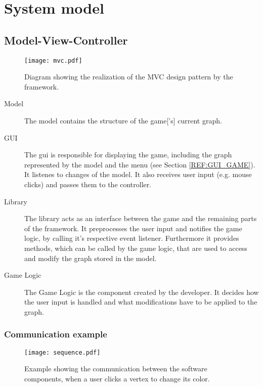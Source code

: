 \section{System model}

\subsection{Model-View-Controller}


\begin{figure}[h]
	\centering
	\texttt{[image: mvc.pdf]}
	\caption{Diagram showing the realization of the \gls{MVC} design pattern by the framework.}
	\label{img:MVC}
\end{figure}

\begin{description}
\item[Model] The model contains the structure of the \gls{game}['s] current \gls{graph}.
\item[GUI] The \gls{gui} is responsible for displaying the game, including the \gls{graph} represented by the model and the menu (see Section \ref{REF:GUI_GAME}). It listenes to changes of the model. It also receives user input (e.g. mouse clicks) and passes them to the controller.
\item[Library] The library acts as an interface between the game and the remaining parts of the framework. It preprocesses the user input and notifies the game logic, by calling it's respective event listener. Furthermore it provides methods, which can be called by the game logic, that are used to access and modify the \gls{graph} stored in the model.
\item[Game Logic] The Game Logic is the component created by the \gls{developer}. It decides how the user input is handled and what modifications have to be applied to the \gls{graph}. 
\end{description}

\subsubsection{Communication example}
\begin{figure}[h!]
	\centering
	\texttt{[image: sequence.pdf]}
	\caption{Example showing the communication between the software components, when a user clicks a vertex to change its color.}
	\label{img:SEQ}
\end{figure}
